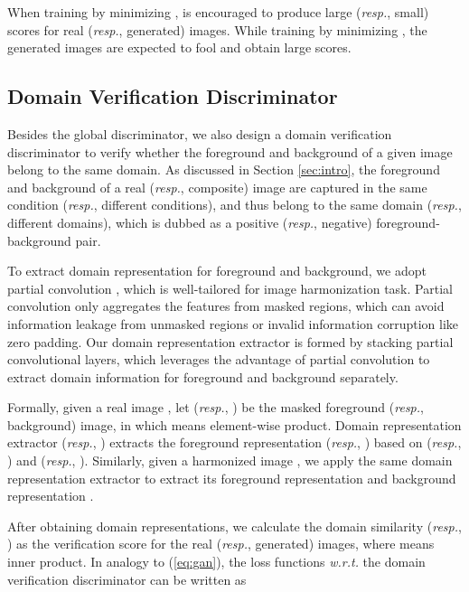\documentclass[10pt,twocolumn,letterpaper]{article}
\begin{document}
When training  by minimizing ,  is encouraged to produce large (\emph{resp.}, small) scores for real (\emph{resp.}, generated) images. While training  by minimizing , the generated images are expected to fool  and obtain large scores.










\subsection{Domain Verification Discriminator}
Besides the global discriminator, we also design a domain verification discriminator to verify whether the foreground and background of a given image belong to the same domain. As discussed in Section \ref{sec:intro}, the foreground and background of a real (\emph{resp.}, composite) image are captured in the same condition (\emph{resp.}, different conditions), and thus belong to the same domain (\emph{resp.}, different domains), which is dubbed as a positive (\emph{resp.}, negative) foreground-background pair.

To extract domain representation for foreground and background, we adopt partial convolution \cite{Liu2018}, which is well-tailored for image harmonization task. Partial convolution only aggregates the features from masked regions, which can avoid information leakage from unmasked regions or invalid information corruption like zero padding. Our domain representation extractor  is formed by stacking partial convolutional layers, which leverages the advantage of partial convolution to extract domain information for foreground and background separately.

Formally, given a real image , let  (\emph{resp.}, ) be the masked foreground (\emph{resp.}, background) image, in which  means element-wise product.
Domain representation extractor  (\emph{resp.}, ) extracts the foreground representation  (\emph{resp.}, ) based on  (\emph{resp.}, ) and  (\emph{resp.}, ). Similarly, given a harmonized image , we apply the same domain representation extractor  to extract its foreground representation  and background representation .


After obtaining domain representations, we calculate the domain similarity  (\emph{resp.}, ) as the verification score for the real (\emph{resp.}, generated) images, where  means inner product. In analogy to (\ref{eq:gan}), the loss functions \emph{w.r.t.} the domain verification discriminator can be written as
\end{document}
